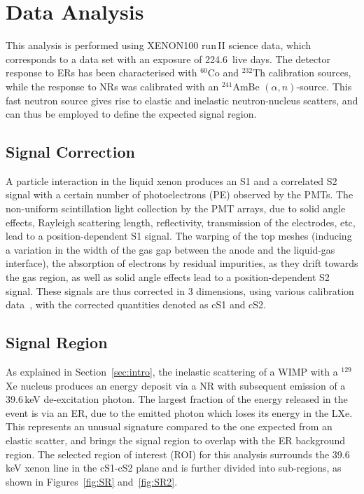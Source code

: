 \section{Data Analysis}
\label{sec:analysis}

This analysis is performed using XENON100 run\,II science data, which corresponds to a data set with an exposure of 224.6~live days. The detector response to
ERs has been characterised with $^{60}$Co and $^{232}$Th calibration sources, while the response to NRs was calibrated with an $^{241}$AmBe $(\alpha,n)$-source. This fast neutron source gives rise to elastic and inelastic neutron-nucleus scatters, and can thus be employed to define the expected signal region.

\subsection{Signal Correction} 

A particle interaction in the liquid xenon produces an S1 and a correlated S2 signal with a certain number of photoelectrons (PE) observed by the PMTs. The non-uniform scintillation light collection by the PMT arrays, due to solid angle effects, Rayleigh scattering length, reflectivity, transmission of the electrodes, etc, lead to a position-dependent S1 signal. The warping of the top meshes (inducing a variation in the width of the gas gap between the anode and the liquid-gas interface), the absorption of electrons by residual impurities, as they drift towards the gas region, as well as solid angle effects lead to a position-dependent S2 signal. These signals are thus corrected in 3 dimensions, using various calibration data~\cite{Aprile:2011dd}, with the corrected quantities denoted as cS1 and cS2.

\subsection{Signal Region} 

As explained in Section~\ref{sec:intro}, the inelastic scattering of a WIMP with a $^{129}$Xe nucleus produces an energy deposit via a NR with subsequent emission of  
a 39.6\,keV de-excitation photon. The largest fraction of the energy released in the event is via an ER, due to the emitted photon which loses its energy in the LXe.
This represents an unusual signature compared to the one expected from an elastic scatter, and brings the signal region to overlap with the ER background region.
The selected region of interest (ROI) for this analysis surrounds the 39.6\,keV xenon line in the cS1-cS2 plane and is further divided into
sub-regions, as shown in Figures~\ref{fig:SR} and~\ref{fig:SR2}.

